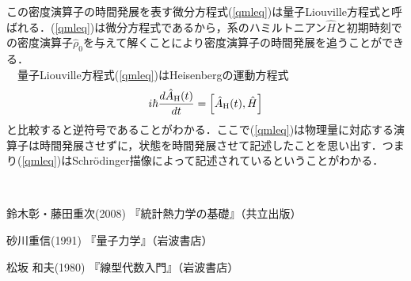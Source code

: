 \documentclass[12pt]{jsarticle}\usepackage{ifthen}\newboolean{enlarge}\setboolean{enlarge}{false}
\newcommand{\rH}{{\rm{H}}}
\begin{document}
この密度演算子の時間発展を表す微分方程式(\ref{qmleq})は量子Liouville方程式と呼ばれる．(\ref{qmleq})は微分方程式であるから，系のハミルトニアン$\hat{H}$と初期時刻での密度演算子$\hat{\rho}_0$を与えて解くことにより密度演算子の時間発展を追うことができる．\\
　量子Liouville方程式(\ref{qmleq})はHeisenbergの運動方程式
　\begin{align}
\label{heiseneq}
i\hbar\frac{d\hat{A}_{\rH}(t)}{dt}=\left[
\hat{A}_{\rH}(t),\hat{H}
\right]
\end{align}
と比較すると逆符号であることがわかる．ここで(\ref{qmleq})は物理量に対応する演算子は時間発展させずに，状態を時間発展させて記述したことを思い出す．つまり(\ref{qmleq})はSchr\"{o}dinger描像によって記述されているということがわかる．









　\begin{thebibliography}{99}
\item
{鈴木彰・藤田重次(2008) 『統計熱力学の基礎』（共立出版）}
\item
{砂川重信(1991)
『量子力学』（岩波書店）}
\item
{松坂 和夫(1980)
『線型代数入門』（岩波書店）}
 
\end{thebibliography}
\end{document}

